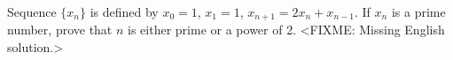 \problem
Sequence $\{x_n\}$ is defined by
$x_0 = 1$, $x_1 = 1$, $x_{n+1} = 2 x_{n} + x_{n-1}$.
If $x_n$ is a prime number, prove that $n$ is either prime or a power of 2.
\solution
<FIXME: Missing English solution.>
\endproblem
